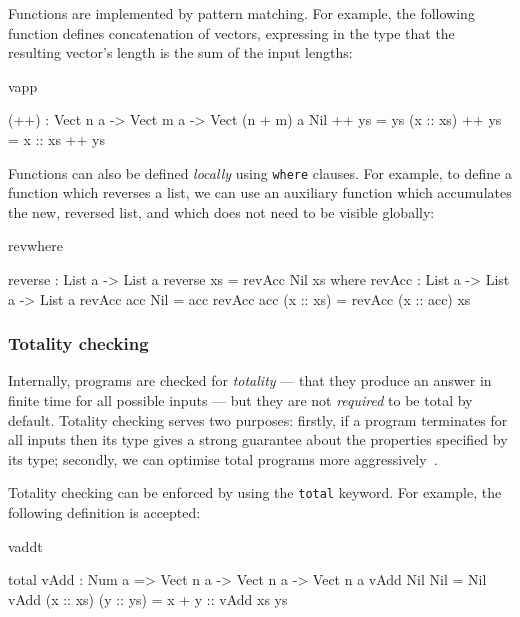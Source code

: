 Functions are implemented by pattern matching. For example, the following
function defines concatenation of vectors, expressing in the type that
the resulting vector's length is the sum of the input lengths:

\begin{SaveVerbatim}{vapp}

(++) : Vect n a -> Vect m a -> Vect (n + m) a
Nil       ++ ys = ys
(x :: xs) ++ ys = x :: xs ++ ys

\end{SaveVerbatim}

\noindent
Functions can also be defined \emph{locally} using \texttt{where} clauses. For
example, to define a function which reverses a list, we can use an auxiliary
function which accumulates the new, reversed list, and which does not need to
be visible globally:

\begin{SaveVerbatim}{revwhere}

reverse : List a -> List a
reverse xs = revAcc Nil xs where
  revAcc : List a -> List a -> List a
  revAcc acc Nil = acc
  revAcc acc (x :: xs) = revAcc (x :: acc) xs

\end{SaveVerbatim}

\subsubsection*{Totality checking}

Internally, \Idris{} programs are checked for \emph{totality} --- that they
produce an answer in finite time for all possible inputs --- but they are not
\emph{required} to be total by default. Totality checking serves two
purposes: firstly, if a program terminates for all inputs 
then its type gives a strong guarantee about the properties specified by its
type; secondly, we can optimise total programs more
aggressively~\cite{Brady2003}. 

Totality checking can be enforced by using the \texttt{total} keyword.
For example, the following definition is accepted:

\begin{SaveVerbatim}{vaddt}

total vAdd : Num a => Vect n a -> Vect n a -> Vect n a
vAdd Nil       Nil       = Nil
vAdd (x :: xs) (y :: ys) = x + y :: vAdd xs ys

\end{SaveVerbatim}


